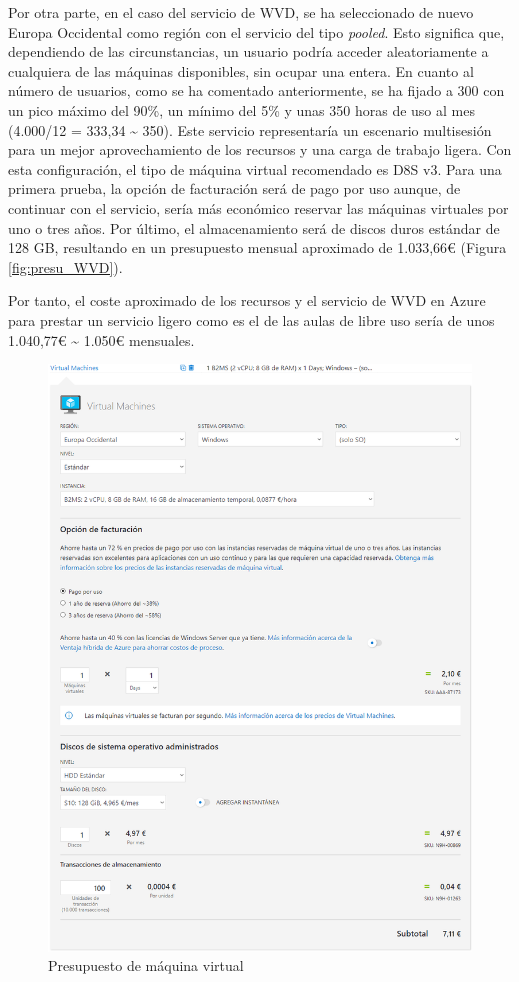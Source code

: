 Por otra parte, en el caso del servicio de \acs{WVD}, se ha seleccionado de nuevo Europa Occidental como región con el servicio del tipo \textit{pooled}. Esto significa que, dependiendo de las circunstancias, un usuario podría acceder aleatoriamente a cualquiera de las máquinas disponibles, sin ocupar una entera. En cuanto al número de usuarios, como se ha comentado anteriormente, se ha fijado a 300 con un pico máximo del 90\%, un mínimo del 5\% y unas 350 horas de uso al mes (4.000/12 = 333,34 \textasciitilde{} 350). Este servicio representaría un escenario multisesión para un mejor aprovechamiento de los recursos y una carga de trabajo ligera. Con esta configuración, el tipo de máquina virtual recomendado es D8S v3. Para una primera prueba, la opción de facturación será de pago por uso aunque, de continuar con el servicio, sería más económico reservar las máquinas virtuales por uno o tres años. Por último, el almacenamiento será de discos duros estándar de 128 \acs{GB}, resultando en un presupuesto mensual aproximado de 1.033,66\euro{} (Figura \ref{fig:presu_WVD}).

Por tanto, el coste aproximado de los recursos y el servicio de \acs{WVD} en Azure para prestar un servicio ligero como es el de las aulas de libre uso sería de unos 1.040,77\euro{} \textasciitilde{} 1.050\euro{} mensuales.

\begin{figure}[h]
  \centering
  \includegraphics[width=0.9\linewidth]{figures/images/presupuesto/presu_mv.png}
  \caption{Presupuesto de máquina virtual}
  \label{fig:presu_mv}
\end{figure}

